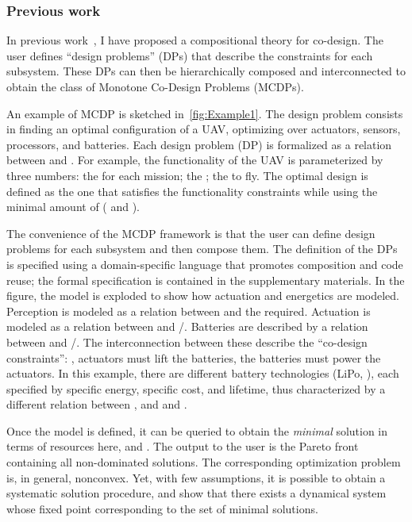 \subsubsection*{Previous work}

In previous work~\cite{censi15monotone,censi15same,censi16codesign_sep16},
I have proposed a compositional theory for co-design.
The user defines
``design problems'' (DPs) that describe the constraints for each
subsystem.
These DPs can then be hierarchically composed and interconnected
to obtain the class of Monotone Co-Design Problems (MCDPs).

An example of MCDP is sketched in~\cref{fig:Example1}.
The
design problem consists in finding an optimal configuration of a UAV,
optimizing over actuators, sensors, processors, and batteries.
Each
design problem (DP) is formalized as a relation between 
and .
For example, the functionality of the UAV is parameterized
by three numbers: the  for each mission; the
; the  to fly.
The
optimal design is defined as the one that satisfies the functionality
constraints while using the minimal amount of  (
and ).

The convenience of the MCDP framework is that the user can define
design problems for each subsystem and then compose them.
The definition
of the DPs is specified using a domain-specific language that promotes
composition and code reuse; the formal specification is contained
in the supplementary materials.
In the figure, the model is exploded
to show how actuation and energetics are modeled.
Perception is modeled
as a relation between  and the 
required.
Actuation is modeled as a relation between  and
/.
Batteries are described by a relation between
 and /.
The interconnection between
these describe the ``co-design constraints'': \eg , actuators must
lift the batteries, the batteries must power the actuators.
In this
example, there are different battery technologies (LiPo, \etc), each
specified by specific energy, specific cost, and lifetime, thus characterized
by a different relation between , 
and  and .

Once the model is defined, it can be queried to obtain the \emph{minimal}
solution in terms of resources \textemdash{} here, 
and .
The output to the user is the Pareto front containing
all non-dominated solutions.
The corresponding optimization problem
is, in general, nonconvex.
Yet, with few assumptions, it is possible
to obtain a systematic solution procedure, and show that there exists
a dynamical system whose fixed point corresponding to the set of minimal
solutions.


